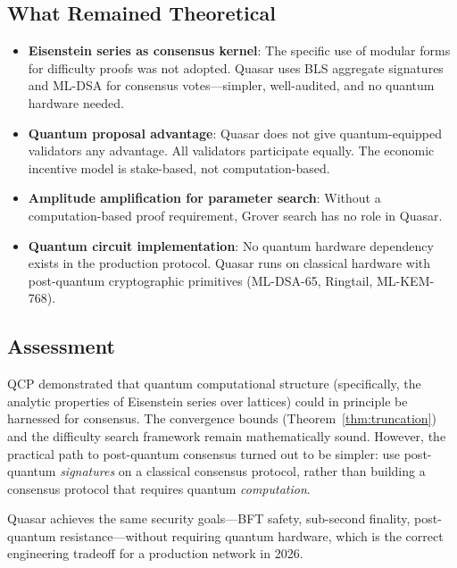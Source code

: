 \documentclass[11pt,a4paper]{article}
\begin{document}
\subsection{What Remained Theoretical}

\begin{itemize}[nosep]
  \item \textbf{Eisenstein series as consensus kernel}: The specific use
        of modular forms for difficulty proofs was not adopted. Quasar
        uses BLS aggregate signatures and ML-DSA for consensus
        votes---simpler, well-audited, and no quantum hardware needed.
  \item \textbf{Quantum proposal advantage}: Quasar does not give
        quantum-equipped validators any advantage. All validators
        participate equally. The economic incentive model is
        stake-based, not computation-based.
  \item \textbf{Amplitude amplification for parameter search}: Without
        a computation-based proof requirement, Grover search has no
        role in Quasar.
  \item \textbf{Quantum circuit implementation}: No quantum hardware
        dependency exists in the production protocol. Quasar runs on
        classical hardware with post-quantum cryptographic primitives
        (ML-DSA-65, Ringtail, ML-KEM-768).
\end{itemize}

\subsection{Assessment}

QCP demonstrated that quantum computational structure (specifically,
the analytic properties of Eisenstein series over lattices) could in
principle be harnessed for consensus. The convergence bounds
(Theorem~\ref{thm:truncation}) and the difficulty search framework
remain mathematically sound. However, the practical path to
post-quantum consensus turned out to be simpler: use post-quantum
\emph{signatures} on a classical consensus protocol, rather than
building a consensus protocol that requires quantum \emph{computation}.

Quasar achieves the same security goals---BFT safety, sub-second
finality, post-quantum resistance---without requiring quantum hardware,
which is the correct engineering tradeoff for a production network in
2026.

\end{document}
